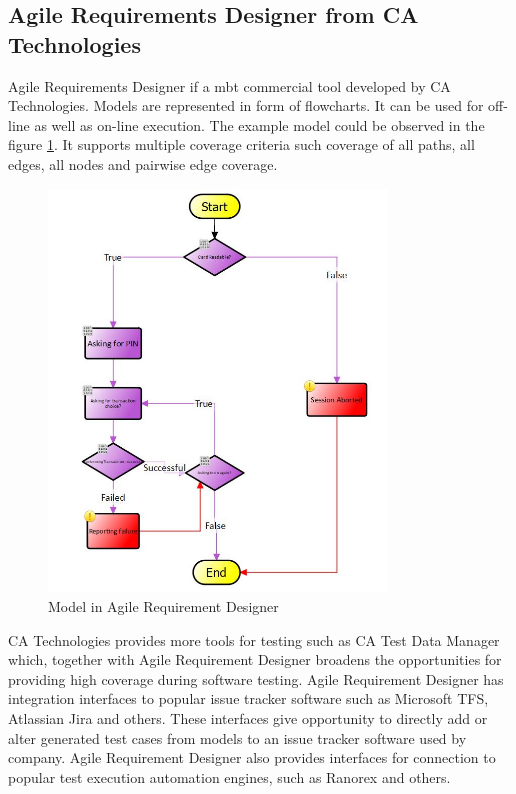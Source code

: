 \subsection{Agile Requirements Designer from CA Technologies}
\par
Agile Requirements Designer if a \acrshort{mbt} commercial tool developed by CA Technologies\cite{Agile_Requirement_Designer_desciption}. Models are represented in form of flowcharts. It can be used for off-line as well as on-line execution. The example model could be observed in the figure \ref{Fig:AgileRequirementDesigner_Charts}. It supports multiple coverage criteria such coverage of all paths, all edges, all nodes and pairwise edge coverage.

\begin{figure} [htbp!]
	\centering
					\includegraphics[width=0.8\textwidth]{figures/AgileRequirementDesigner_Charts.JPG}
					\caption{\label{Fig:AgileRequirementDesigner_Charts} Model in Agile Requirement Designer}
\end{figure}

\par
CA Technologies provides more tools for testing such as CA Test Data Manager which, together with Agile Requirement Designer broadens the opportunities for providing high coverage during software testing. Agile Requirement Designer has integration interfaces to popular issue tracker software such as Microsoft TFS, Atlassian Jira and others. These interfaces give opportunity to directly add or alter generated test cases from models to an issue tracker software used by company. Agile Requirement Designer also provides interfaces for connection to popular test execution automation engines, such as Ranorex and others.

